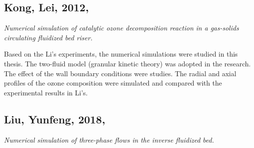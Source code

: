 \subsection[Kong, Lei, 2012]{Kong, Lei, 2012, \cite{konglei2012}}
\textit{Numerical simulation of catalytic ozone decomposition reaction in a gas-solids circulating fluidized bed riser.}

Based on the Li's experiments, the numerical simulations were studied in this thesis. 
The two-fluid model (granular kinetic theory) was adopted in the research. 
The effect of the wall boundary conditions were studies. 
The radial and axial profiles of the ozone composition were simulated and compared with the experimental results in Li's.

%
%
\subsection[Liu, Yunfeng, 2018]{Liu, Yunfeng, 2018, \cite{liuyf2018}}
\textit{Numerical simulation of three-phase flows in the inverse fluidized bed.}

